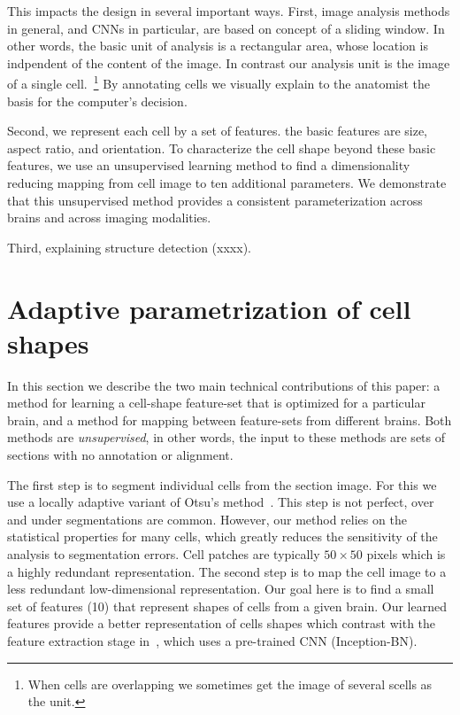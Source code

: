 \documentclass[runningheads]{llncs}
\begin{document}
This impacts the design in several important ways. First, image
analysis methods in general, and CNNs in particular, are based on
concept of a sliding window. In other words, the basic unit of
analysis is a rectangular area, whose location is indpendent of the
content of the image. In contrast our analysis unit is the image of a
single cell.~\footnote{When cells are overlapping we sometimes get
  the image of several scells as the unit.} By annotating cells we
visually explain to the anatomist the basis for the computer's
decision.

Second, we represent each cell by a set of features. the basic 
features are size, aspect ratio, and orientation. To characterize the
cell shape beyond these basic features, we use an unsupervised
learning method to find a dimensionality reducing mapping from cell
image to ten additional parameters. We demonstrate that this
unsupervised method provides a consistent parameterization across
brains and across imaging modalities.

Third, explaining structure detection (xxxx).



\section{Adaptive parametrization of cell shapes}
\label{sec:DM}
In this section we describe the two main technical contributions of this
paper: a method for learning a cell-shape feature-set that is optimized
for a particular brain, and a method for mapping between feature-sets
from different brains. Both methods are {\em unsupervised}, in other
words, the input to these methods are sets of sections with no
annotation or alignment.

The first step is to segment individual cells from the section
image. For this we use a locally adaptive variant of
Otsu's method~\cite{otsu1979threshold}. This step is not perfect, over and under segmentations are
common. However, our method relies on the statistical properties for
many cells, which greatly reduces the sensitivity of the analysis to
segmentation errors. 
Cell patches are typically $50\times 50$ pixels which is a highly
redundant representation. The second step is to
map the cell image to a less redundant low-dimensional representation. Our goal here
is to find a small set of features (10) that represent shapes of cells
from a given brain. Our learned features provide a better representation 
of cells shapes which contrast with the feature extraction stage in~\cite{chen2019active}, 
which uses a pre-trained CNN (Inception-BN). 
\end{document}
